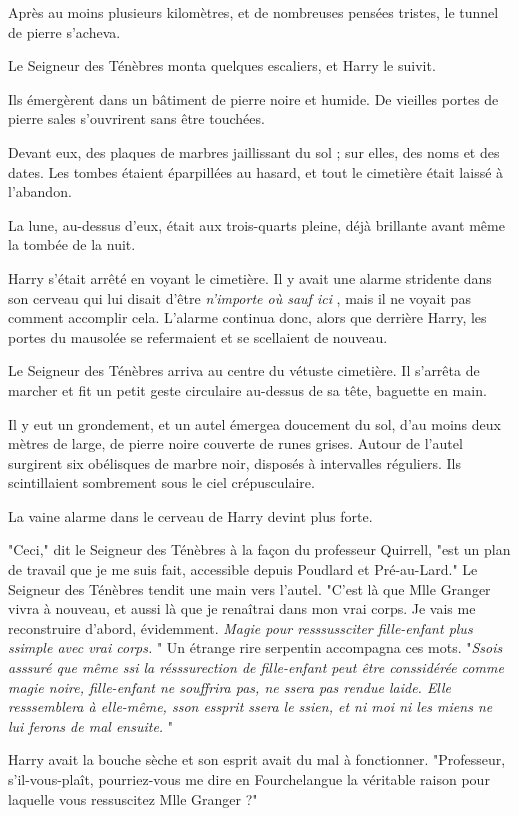 Après au moins plusieurs kilomètres, et de nombreuses pensées tristes, le tunnel de pierre s'acheva.

Le Seigneur des Ténèbres monta quelques escaliers, et Harry le suivit.

Ils émergèrent dans un bâtiment de pierre noire et humide. De vieilles portes de pierre sales s'ouvrirent sans être touchées.

Devant eux, des plaques de marbres jaillissant du sol ; sur elles, des noms et des dates. Les tombes étaient éparpillées au hasard, et tout le cimetière était laissé à l'abandon.

La lune, au-dessus d'eux, était aux trois-quarts pleine, déjà brillante avant même la tombée de la nuit.

Harry s'était arrêté en voyant le cimetière. Il y avait une alarme stridente dans son cerveau qui lui disait d'être \emph{n'importe où sauf ici} , mais il ne voyait pas comment accomplir cela. L'alarme continua donc, alors que derrière Harry, les portes du mausolée se refermaient et se scellaient de nouveau.

Le Seigneur des Ténèbres arriva au centre du vétuste cimetière. Il s'arrêta de marcher et fit un petit geste circulaire au-dessus de sa tête, baguette en main.

Il y eut un grondement, et un autel émergea doucement du sol, d'au moins deux mètres de large, de pierre noire couverte de runes grises. Autour de l'autel surgirent six obélisques de marbre noir, disposés à intervalles réguliers. Ils scintillaient sombrement sous le ciel crépusculaire.

La vaine alarme dans le cerveau de Harry devint plus forte.

"Ceci," dit le Seigneur des Ténèbres à la façon du professeur Quirrell, "est un plan de travail que je me suis fait, accessible depuis Poudlard et Pré-au-Lard." Le Seigneur des Ténèbres tendit une main vers l'autel. "C'est là que Mlle Granger vivra à nouveau, et aussi là que je renaîtrai dans mon vrai corps. Je vais me reconstruire d'abord, évidemment. \emph{Magie pour resssussciter fille-enfant plus ssimple avec vrai corps.} " Un étrange rire serpentin accompagna ces mots. "\emph{Ssois asssuré que même ssi la résssurection de fille-enfant peut être conssidérée comme magie noire, fille-enfant ne souffrira pas, ne ssera pas rendue laide. Elle resssemblera à elle-même, sson essprit ssera le ssien, et ni moi ni les miens ne lui ferons de mal ensuite.} "

Harry avait la bouche sèche et son esprit avait du mal à fonctionner. "Professeur, s'il-vous-plaît, pourriez-vous me dire en Fourchelangue la véritable raison pour laquelle vous ressuscitez Mlle Granger ?"

